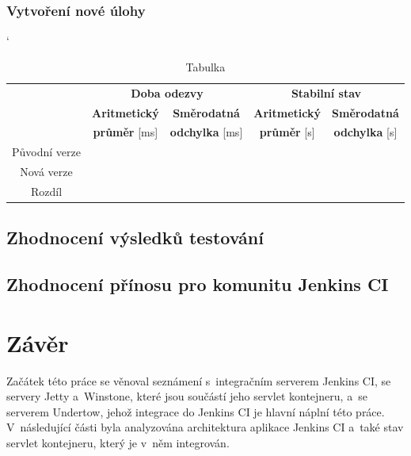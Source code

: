         \subsection{Vytvoření nové úlohy}

            \begin{table}[ht]
             \catcode`
             \begin{center}
              \begin{tabular}{| c || c | c || c | c |} \hline
                \multirow{3}{*}{}  &   \multicolumn{2}{c||}{\textbf{Doba odezvy}}  &  \multicolumn{2}{c|}{\textbf{Stabilní stav}}\\ \cline{2-5}
                 & \textbf{Aritmetický}  &  \textbf{Směrodatná}  &  \textbf{Aritmetický} &  \textbf{Směrodatná}\\ 
                 & \textbf{průměr} [ms]  &  \textbf{odchylka} [ms]  &  \textbf{průměr} [s]  &  \textbf{odchylka} [s]\\ \hline
                Původní verze &   &   &   &  \\\hline
                Nová verze &   &   &   &  \\\hline
                Rozdíl &   &   &   &  \\\hline  
              \end{tabular}
              \caption{Tabulka}
              \label{tab3}
             \end{center}
            \end{table}


    \section{Zhodnocení výsledků testování}


    \section{Zhodnocení přínosu pro komunitu Jenkins CI}
    


\chapter{Závěr}
    Začátek této práce se věnoval seznámení s~integračním serverem Jenkins CI,
    se servery Jetty a~Winstone, které jsou součástí jeho servlet kontejneru,
    a~se serverem Undertow, jehož integrace do Jenkins CI je hlavní
    náplní této práce. V~následující části byla analyzována architektura aplikace Jenkins CI
    a~také stav servlet kontejneru, který je v~něm integrován.

